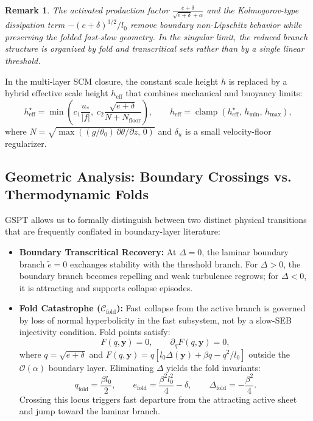 \documentclass[11pt,letterpaper]{article}
\newtheorem{remark}{Remark}
\begin{document}
\begin{remark}
The activated production factor $\frac{e+\delta}{\sqrt{e+\delta}+\alpha}$ and the Kolmogorov-type dissipation term $-(e+\delta)^{3/2}/l_0$ remove boundary non-Lipschitz behavior while preserving the folded fast-slow geometry. In the singular limit, the reduced branch structure is organized by fold and transcritical sets rather than by a single linear threshold.
\end{remark}

In the multi-layer SCM closure, the constant scale height $h$ is replaced by a hybrid effective scale height $h_{\text{eff}}$ that combines mechanical and buoyancy limits:
\begin{equation}
h_{\text{eff}}^{\star}=\min\left(c_1\frac{u_*}{|f|},\;c_2\frac{\sqrt{e+\delta}}{N+N_{\text{floor}}}\right),
\qquad
h_{\text{eff}}=\operatorname{clamp}(h_{\text{eff}}^{\star},\,h_{\min},\,h_{\max}),
\label{eq:heff_emergent}
\end{equation}
where $N=\sqrt{\max\left((g/\theta_0)\,\partial\theta/\partial z,\,0\right)}$ and $\delta_u$ is a small velocity-floor regularizer.

\subsection{Geometric Analysis: Boundary Crossings vs. Thermodynamic Folds}
\label{subsec:geometric_consequences}

GSPT allows us to formally distinguish between two distinct physical transitions that are frequently conflated in boundary-layer literature:
\begin{itemize}
    \item \textbf{Boundary Transcritical Recovery:} At $\Delta=0$, the laminar boundary branch $\tilde e=0$ exchanges stability with the threshold branch. For $\Delta>0$, the boundary branch becomes repelling and weak turbulence regrows; for $\Delta<0$, it is attracting and supports collapse episodes.
    \item \textbf{Fold Catastrophe ($\mathcal{C}_{\text{fold}}$):} Fast collapse from the active branch is governed by loss of normal hyperbolicity in the fast subsystem, not by a slow-SEB injectivity condition. Fold points satisfy:
    \begin{equation}
    F(q,\mathbf{y})=0, \qquad \partial_q F(q,\mathbf{y})=0,
    \end{equation}
    where $q=\sqrt{e+\delta}$ and $F(q,\mathbf{y})=q\left[l_0\Delta(\mathbf{y})+\beta q-q^2/l_0\right]$ outside the $\mathcal{O}(\alpha)$ boundary layer. Eliminating $\Delta$ yields the fold invariants:
    \begin{equation}
    q_{\mathrm{fold}}=\frac{\beta l_0}{2},\qquad
    e_{\mathrm{fold}}=\frac{\beta^2 l_0^2}{4}-\delta,\qquad
    \Delta_{\mathrm{fold}}=-\frac{\beta^2}{4}.
    \end{equation}
    Crossing this locus triggers fast departure from the attracting active sheet and jump toward the laminar branch.
\end{itemize}
\end{document}

